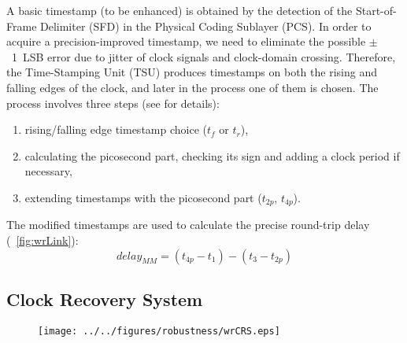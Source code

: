 A basic timestamp (to be enhanced) is obtained by the detection of 
the Start-of-Frame Delimiter (SFD) in the Physical Coding Sublayer (PCS).
In order to acquire a precision-improved timestamp, we need to eliminate the possible 
$\pm$~1~LSB error  %
due to jitter of clock signals and clock-domain crossing. 
Therefore, the Time-Stamping Unit (TSU) produces timestamps on both the rising 
and falling edges of the clock, and later in the process one of them is chosen.
The process involves three steps (see \cite{biblio:TomekMSc} for details):
\begin{enumerate}
   \item rising/falling edge timestamp choice ($t_f$ or $t_r$),
   \item calculating the picosecond part, checking
         its sign and adding a clock period if necessary,
   \item extending timestamps with the picosecond part ($t_{2p}$, $t_{4p}$).
 \end{enumerate}
The modified timestamps are used to calculate the precise round-trip delay
(\figurename~\ref{fig:wrLink}):
\begin{equation}
  \label{eq:delaymm}
  delay_{MM} = (t_{4p}-t_{1}) - (t_{3}-t_{2p})
\end{equation}




\subsection{ Clock Recovery System}
\label{sec:wrCRS}

\begin{figure}[!t]
\centering
\texttt{[image: ../../figures/robustness/wrCRS.eps]}
\caption{}
\label{fig:PLL}
\end{figure}

